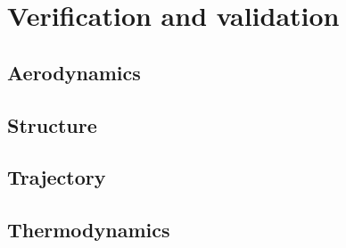 \section{Verification and validation}

\subsection{Aerodynamics} \label{sec:VandVaero}


\subsection{Structure} \label{sec:VandVstruc}


\subsection{Trajectory} \label{sec:VandVtraj}


\subsection{Thermodynamics} \label{sec:VandVthermo}

